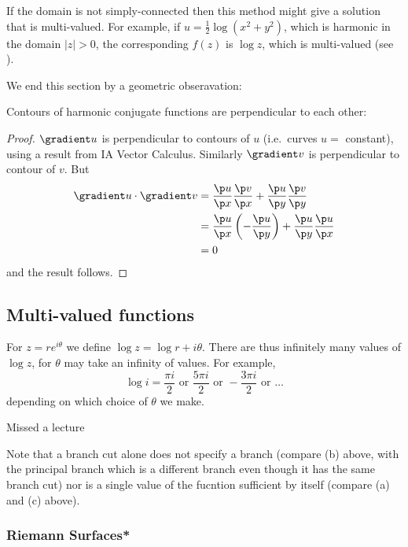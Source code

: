 \documentclass[a4paper]{article}
\begin{document}
If the domain is not simply-connected then this method might give a solution that is multi-valued. For example, if \(u = \frac{1}{2} \log(x^2 + y^2)\), which is harmonic in the domain \(|z| > 0\), the corresponding \(f(z)\) is \(\log z\), which is multi-valued (see ).

We end this section by a geometric obseravation:

\begin{proposition}
  Contours of harmonic conjugate functions are perpendicular to each other:
\end{proposition}

\begin{proof}
  \(\gradient u\) is perpendicular to contours of \(u\) (i.e.\ curves \(u = \) constant), using a result from IA Vector Calculus. Similarly \(\gradient v\) is perpendicular to contour of \(v\). But
  \begin{align*}
    \gradient u \cdot \gradient v &= \frac{\p u}{\p x}\frac{\p v}{\p x} + \frac{\p u}{\p y}\frac{\p v}{\p y} \\
                                  &= \frac{\p u}{\p x}\left(-\frac{\p u}{\p y}\right) + \frac{\p u}{\p y}\frac{\p u}{\p x} \\
                                  &= 0
  \end{align*}
  and the result follows.
\end{proof}

\subsection{Multi-valued functions}\label{sec:multi-valued functions}

For \(z = re^{i\theta}\) we define \(\log z = \log r + i\theta\). There are thus infinitely many values of \(\log z\), for \(\theta\) may take an infinity of values. For example,
\[
  \log i = \frac{\pi i}{2} \text{ or } \frac{5\pi i}{2} \text{ or } -\frac{3\pi i}{2} \text{ or } \dots
\]
depending on which choice of \(\theta\) we make.

Missed a lecture

Note that a branch cut alone does not specify a branch (compare (b) above, with the principal branch which is a different branch even though it has the same branch cut) nor is a single value of the fucntion sufficient by itself (compare (a) and (c) above).

\subsubsection{Riemann Surfaces*}
\end{document}
